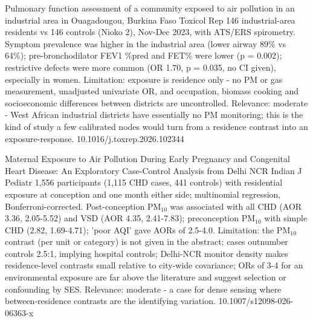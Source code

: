 \documentclass[10pt]{article}
\begin{document}
\par{}\baselineskip{}\baselineskip
{}

{Pulmonary function assessment of a community exposed to air pollution in an industrial area in Ouagadougou, Burkina Faso}
{Toxicol Rep}
{146 industrial-area residents vs 146 controls (Nioko 2), Nov-Dec 2023, with ATS/ERS spirometry. Symptom prevalence was higher in the industrial area (lower airway 89\% vs 64\%); pre-bronchodilator FEV1 \%pred and FET\% were lower (p = 0.002); restrictive defects were more common (OR 1.70, p = 0.035, no CI given), especially in women. Limitation: exposure is residence only - no PM or gas measurement, unadjusted univariate OR, and occupation, biomass cooking and socioeconomic differences between districts are uncontrolled. Relevance: moderate - West African industrial districts have essentially no PM monitoring; this is the kind of study a few calibrated nodes would turn from a residence contrast into an exposure-response.}
{10.1016/j.toxrep.2026.102344}

\par{}\baselineskip{}\baselineskip
{}

{Maternal Exposure to Air Pollution During Early Pregnancy and Congenital Heart Disease: An Exploratory Case-Control Analysis from Delhi NCR}
{Indian J Pediatr}
{1,556 participants (1,115 CHD cases, 441 controls) with residential exposure at conception and one month either side; multinomial regression, Bonferroni-corrected. Post-conception PM$_{10}$ was associated with all CHD (AOR 3.36, 2.05-5.52) and VSD (AOR 4.35, 2.41-7.83); preconception PM$_{10}$ with simple CHD (2.82, 1.69-4.71); 'poor AQI' gave AORs of 2.5-4.0. Limitation: the PM$_{10}$ contrast (per unit or category) is not given in the abstract; cases outnumber controls 2.5:1, implying hospital controls; Delhi-NCR monitor density makes residence-level contrasts small relative to city-wide covariance; ORs of 3-4 for an environmental exposure are far above the literature and suggest selection or confounding by SES. Relevance: moderate - a case for dense sensing where between-residence contrasts are the identifying variation.}
{10.1007/s12098-026-06363-x}

\par{}\baselineskip{}\baselineskip
{}
\end{document}
